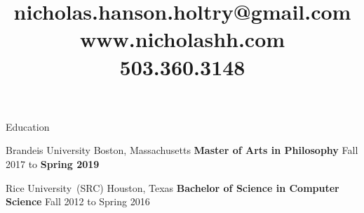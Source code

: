 \documentclass{resume}
\title{%
nicholas.hanson.holtry@gmail.com \\
www.nicholashh.com \\
503.360.3148}
\begin{document}





\begin{rSection}{Education}


  \begin{rSubSection}
  {Brandeis \normalfont University}
  {Boston, Massachusetts}
  {\bf Master \normalfont of Arts in \bf Philosophy}
  {Fall 2017 to \bf{Spring 2019}}%
  \iftoggle{cv}{
    \item Thesis:~``Reasoning First Rationality''
    \item Advisors:~Dr.~Berislav Maru{\v s}i{\' c}, Dr.~Eli Hirsch
    \item Philosophy GPA:~\tab{$4.00/4.00$}
    \item Overall GPA:~\tab{$3.96/4.00$}
  }{
    \item GPA:~$3.93/4.00$
  }
  \end{rSubSection}

  \begin{rSubSection}
  {Rice \normalfont University~(SRC)}
  {Houston, Texas}
  {\bf Bachelor \normalfont of Science in \bf Computer Science}
  {Fall 2012 to Spring 2016}%
  \iftoggle{cv}{
    \item Comp Sci GPA:~\tab{$3.68/4.00$}
    \item Overall GPA:~\tab{$3.61/4.00$}
  }{
    \item GPA:~$3.61/4.00$
  }
  \end{rSubSection}










\end{rSection}
\end{document}
